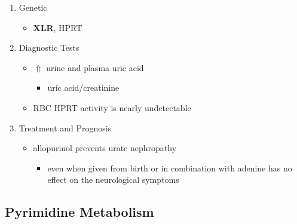 \documentclass{scrartcl}
\begin{document}
\begin{enumerate}
\item Genetic
\label{sec:orgb36389a}
\begin{itemize}
\item \textbf{XLR}, HPRT
\end{itemize}

\item Diagnostic Tests
\label{sec:org85bf0b3}
\begin{itemize}
\item \(\Uparrow\) urine and plasma uric acid
\begin{itemize}
\item uric acid/creatinine
\end{itemize}
\item RBC HPRT activity is nearly undetectable
\end{itemize}

\item Treatment and Prognosis
\label{sec:org363c8a4}
\begin{itemize}
\item allopurinol prevents urate nephropathy
\begin{itemize}
\item even when given from birth or in combination with adenine has no
effect on the neurological symptoms
\end{itemize}
\end{itemize}
\end{enumerate}

\subsection{Pyrimidine Metabolism}
\label{sec:org96d871b}
\end{document}
